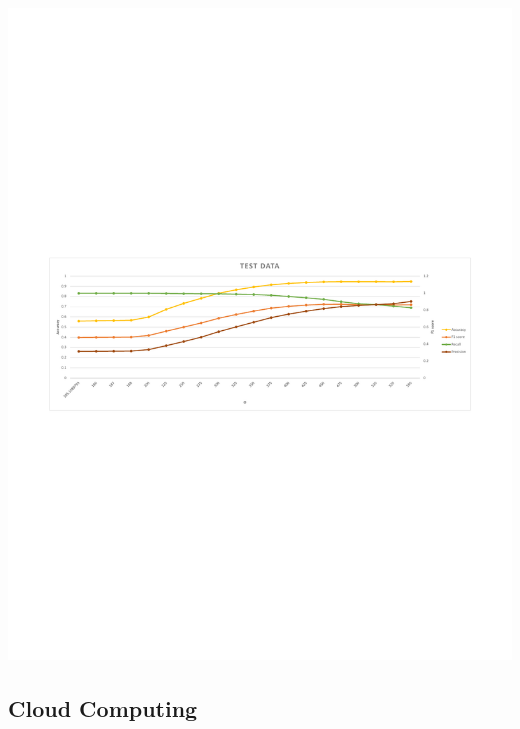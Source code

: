 \documentclass[xelatex,usenames,dvipsnames]{beamer}
\begin{document}
\begin{frame}[standout]
    \includegraphics[width = \textwidth]{figs/Edge_Test_Results.pdf}
  
  
  
    
  
  \end{frame}


  \subsection{Cloud Computing}
\end{document}
